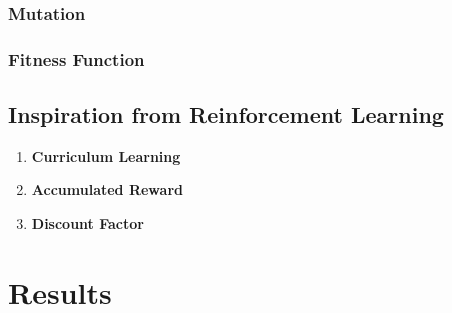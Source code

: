\documentclass[sigconf]{acmart}
\begin{document}
\subsubsection{Mutation}
\subsubsection{Fitness Function}
\subsection{Inspiration from Reinforcement Learning}
\begin{enumerate}
  \item \textbf{Curriculum Learning} 
  \item \textbf{Accumulated Reward}
  \item \textbf{Discount Factor}
\end{enumerate}



\section{Results}




\end{document}
